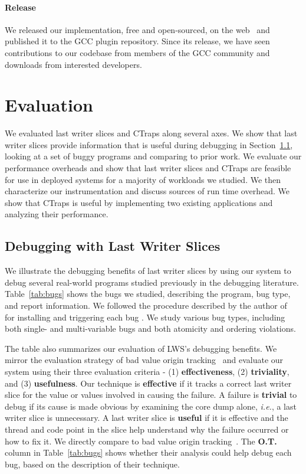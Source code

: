 \documentclass[10pt,nocopyrightspace]{sigplanconf}
\newcommand{\ctraps}{CTraps\xspace}
\newcommand{\lws}{LWS\xspace}
\begin{document}
\paragraph{Release}
We released our implementation, free and open-sourced, on the
web~\cite{ctrapsrelease} and published it to the GCC plugin repository.
Since its release, we have seen contributions to our codebase from members of
the GCC community and downloads from interested developers.

\section{Evaluation}
\label{sec:eval}
We evaluated last writer slices and \ctraps along several axes.  We show that
last writer slices provide information that is useful during debugging in
Section~\ref{sec:eval:debugging}, looking at a set of buggy programs and
comparing to prior work.  We evaluate our performance overheads and
show that last writer slices and \ctraps are feasible for use in deployed
systems for a majority of workloads we studied.  We then characterize our
instrumentation and discuss sources of run time overhead.   We
show that \ctraps is useful by implementing two existing applications and
analyzing their performance.    

\subsection{Debugging with Last Writer Slices}
\label{sec:eval:debugging}

We illustrate the debugging benefits of last writer slices by using our system
to debug several real-world programs studied previously in the debugging
literature.  Table~\ref{tab:bugs} shows the bugs we studied, describing the
program, bug type, and report information.  We followed the procedure described
by the author of~\cite{concurrencybugs} for installing and triggering each bug
.  We study various bug types, including both single- and
multi-variable bugs and both atomicity and ordering violations.

The table also summarizes our evaluation of \lws's debugging
benefits.  We mirror the evaluation strategy of bad value origin
tracking~\cite{badapples} and evaluate our system using their three
evaluation criteria - (1) {\bf effectiveness}, (2) {\bf triviality}, and (3)
{\bf usefulness}.  Our technique is {\bf effective} if it tracks a correct last
writer slice for the value or values involved in causing the failure.  A failure is {\bf
trivial} to debug if its cause is made obvious by examining the core dump
alone, {\em i.e.}, a last writer slice is unnecessary.  A last writer slice is
{\bf useful} if it is effective and the thread and code point in the slice help
understand why the failure occurred or how to fix it.   We directly compare to
bad value origin tracking~\cite{badapples}.    The {\bf O.T.} column in Table~\ref{tab:bugs}
shows  whether their analysis could help debug each bug, based on the
description of their technique.
\end{document}
